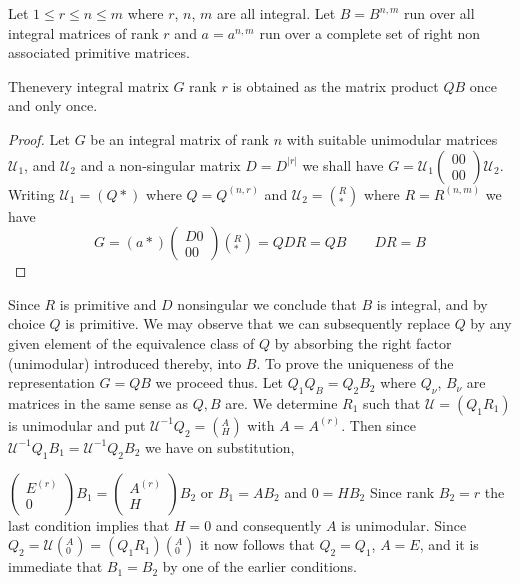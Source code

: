 \begin{lem}\label{chap13:lem22}%
Let $1 \le r \le n \le m$ where $r$, $n$, $m$  are all integral. Let $B
  = B^{n , m}$ run over all integral matrices of rank $r$ and $a =
  a^{n ,m}$ run over a complete set of right non associated primitive
  matrices. 

Then\pageoriginale every integral matrix $G$ rank $r$ is obtained as
the matrix product $QB$ once and only once.  
\end{lem}

\begin{proof}
Let $G$ be an integral matrix of rank $n$ with suitable unimodular
matrices $\mathcal{U}_1$, and $\mathcal{U}_2$ and a non-singular
matrix $D = D^{|r|}$ we shall have 
$G = \mathcal{U}_1 \begin{pmatrix} 0 0 \\ 0
  0  \end{pmatrix}\mathcal{U}_2$. Writing $\mathcal{U}_1 = (Q *)$
where $Q = Q^{(n, r)}$  and $\mathcal{U}_2 = ( ^R_*)$ where $R =R^{(n,
  m)}$ we have 
$$
G = (a  *) \begin{pmatrix} D  0 \\ 0  0\end{pmatrix} ( ^R_*) = Q D R =
  Q B \qquad DR = B 
$$
\end{proof}

Since $R$ is primitive and $D$ nonsingular we conclude that $B$ is
integral, and by choice $Q$ is primitive. We may observe that we can
subsequently replace $Q$ by any given element of the equivalence class
of $Q$ by absorbing the right factor (unimodular) introduced thereby,
into $B$. To prove the uniqueness of the representation $G = QB$ we
proceed thus. Let $Q_1 Q_B = Q_2 B_2$ where $Q_\nu$, $B_\nu$ are
matrices in the same sense as $Q, B$ are. We determine $R_1$ such that
$\mathcal{U} = (Q_1 R_1)$ is unimodular and put $\mathcal{U}^{-1} Q_2
= (^A_H)$ with $A = A^{(r)}$. Then since $\mathcal{U}^{-1}Q_1 B_1 =
\mathcal{U}^{-1} Q_2 B_2$ we have on substitution, 

$\begin{pmatrix} E^{(r)}\\ 0 \end{pmatrix} B_1 = \begin{pmatrix} 
  A^{(r)}\\ H \end{pmatrix} B_2$ or $B_1 = AB_2$  and $0 = HB_2$ Since
rank $B_2 = r$ the last condition implies that $H = 0$ and
consequently $A$ is unimodular. Since 
$Q_2 = \mathcal{U}(^A_0) = (Q_1 R_1)(^A_0)$ it now follows that $Q_2 =
Q_1$, $A = E$, and it is immediate that $B_1 = B_2$ by one of the
earlier conditions. 


